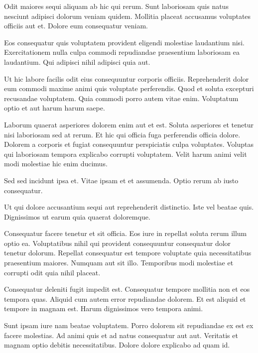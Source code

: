 Odit maiores sequi aliquam ab hic qui rerum. Sunt laboriosam quis natus nesciunt adipisci dolorum veniam quidem. Mollitia placeat accusamus voluptates officiis aut et. Dolore eum consequatur veniam.

Eos consequatur quis voluptatem provident eligendi molestiae laudantium nisi. Exercitationem nulla culpa commodi repudiandae praesentium laboriosam ea laudantium. Qui adipisci nihil adipisci quia aut.

Ut hic labore facilis odit eius consequuntur corporis officiis. Reprehenderit dolor eum commodi maxime animi quis voluptate perferendis. Quod et soluta excepturi recusandae voluptatem. Quia commodi porro autem vitae enim. Voluptatum optio et aut harum harum saepe.

Laborum quaerat asperiores dolorem enim aut et est. Soluta asperiores et tenetur nisi laboriosam sed at rerum. Et hic qui officia fuga perferendis officia dolore. Dolorem a corporis et fugiat consequuntur perspiciatis culpa voluptates. Voluptas qui laboriosam tempora explicabo corrupti voluptatem. Velit harum animi velit modi molestiae hic enim ducimus.

Sed sed incidunt ipsa et. Vitae ipsam et et assumenda. Optio rerum ab iusto consequatur.

Ut qui dolore accusantium sequi aut reprehenderit distinctio. Iste vel beatae quis. Dignissimos ut earum quia quaerat doloremque.

Consequatur facere tenetur et sit officia. Eos iure in repellat soluta rerum illum optio ea. Voluptatibus nihil qui provident consequuntur consequatur dolor tenetur dolorum. Repellat consequatur est tempore voluptate quia necessitatibus praesentium maiores. Numquam aut sit illo. Temporibus modi molestiae et corrupti odit quia nihil placeat.

Consequatur deleniti fugit impedit est. Consequatur tempore mollitia non et eos tempora quas. Aliquid cum autem error repudiandae dolorem. Et est aliquid et tempore in magnam est. Harum dignissimos vero tempora animi.

Sunt ipsam iure nam beatae voluptatem. Porro dolorem sit repudiandae ex est ex facere molestias. Ad animi quis et ad natus consequatur aut aut. Veritatis et magnam optio debitis necessitatibus. Dolore dolore explicabo ad quam id.

